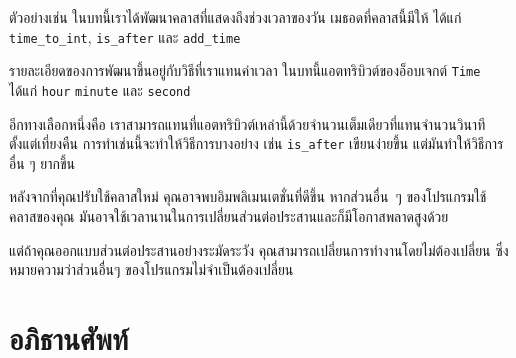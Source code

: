 
ตัวอย่างเช่น ในบทนี้เราได้พัฒนาคลาสที่แสดงถึงช่วงเวลาของวัน เมธอดที่คลาสนี้มีให้ 
ได้แก่ \verb"time_to_int", \verb"is_after" และ \verb"add_time" 



รายละเอียดของการพัฒนาขึ้นอยู่กับวิธีที่เราแทนค่าเวลา  ในบทนี้แอตทริบิวต์ของอ็อบเจกต์ {\tt Time} ได้แก่ {\tt hour} {\tt minute} และ
{\tt second}


อีกทางเลือกหนึ่งคือ เราสามารถแทนที่แอตทริบิวต์เหล่านี้ด้วยจำนวนเต็มเดียวที่แทนจำนวนวินาทีตั้งแต่เที่ยงคืน 
การทำเช่นนี้จะทำให้วิธีการบางอย่าง เช่น \verb"is_after" เขียนง่ายขึ้น แต่มันทำให้วิธีการอื่น ๆ ยากขึ้น



หลังจากที่คุณปรับใช้คลาสใหม่ คุณอาจพบอิมพลิเมนเตชั่นที่ดีขึ้น 
หากส่วนอื่น~ๆ ของโปรแกรมใช้คลาสของคุณ 
มันอาจใช้เวลานานในการเปลี่ยนส่วนต่อประสานและก็มีโอกาสพลาดสูงด้วย
  


แต่ถ้าคุณออกแบบส่วนต่อประสานอย่างระมัดระวัง คุณสามารถเปลี่ยนการทำงานโดยไม่ต้องเปลี่ยน ซึ่งหมายความว่าส่วนอื่นๆ ของโปรแกรมไม่จำเป็นต้องเปลี่ยน


\section{อภิธานศัพท์}

